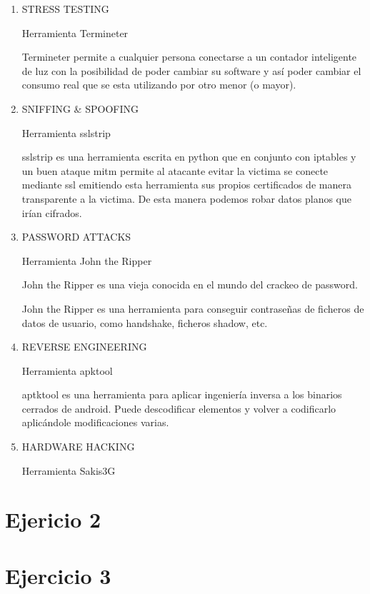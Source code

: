 \documentclass[a4paper]{article}
\begin{document}
\begin{enumerate}
\item STRESS TESTING

Herramienta Termineter

Termineter permite a cualquier persona conectarse a un contador inteligente de luz con la posibilidad de poder cambiar su software y así poder cambiar el consumo real que se esta utilizando por otro menor (o mayor).


\item SNIFFING \& SPOOFING


Herramienta sslstrip

sslstrip es una herramienta escrita en python que en conjunto con iptables y un buen ataque mitm permite al atacante evitar la victima se conecte mediante ssl emitiendo esta herramienta sus propios certificados de manera transparente a la victima. De esta manera podemos robar datos planos que irían cifrados.


\item PASSWORD ATTACKS

Herramienta John the Ripper

John the Ripper es una vieja conocida en el mundo del crackeo de password.

John the Ripper es una herramienta para conseguir contraseñas de ficheros de datos de usuario, como handshake, ficheros shadow, etc. 


\item REVERSE ENGINEERING

Herramienta apktool

aptktool es una herramienta para aplicar ingeniería inversa a los binarios cerrados de android. Puede descodificar elementos y volver a codificarlo aplicándole modificaciones varias.   



\item HARDWARE HACKING

Herramienta Sakis3G





\end{enumerate}

\section{Ejericio  2 }



\section{Ejercicio 3}
\end{document}
